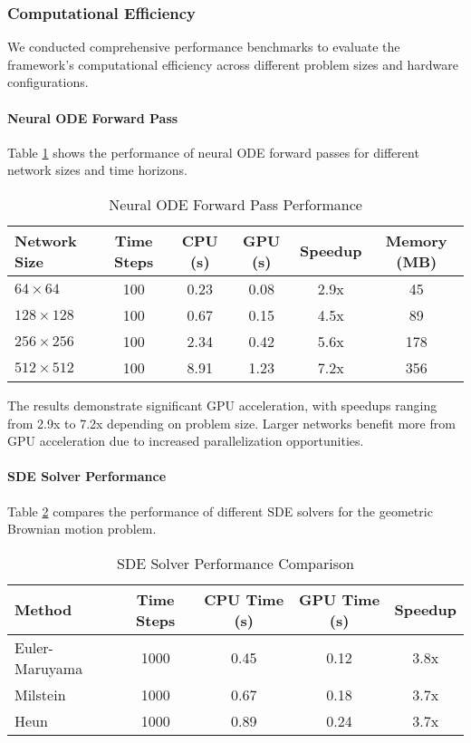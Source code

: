 \subsubsection{Computational Efficiency}

We conducted comprehensive performance benchmarks to evaluate the framework's computational efficiency across different problem sizes and hardware configurations.

\paragraph{Neural ODE Forward Pass}
Table \ref{tab:neural_ode_performance} shows the performance of neural ODE forward passes for different network sizes and time horizons.

\begin{table}[h]
\centering
\caption{Neural ODE Forward Pass Performance}
\label{tab:neural_ode_performance}
\begin{tabular}{lccccc}
\toprule
Network Size & Time Steps & CPU (s) & GPU (s) & Speedup & Memory (MB) \\
\midrule
$64 \times 64$ & 100 & 0.23 & 0.08 & 2.9x & 45 \\
$128 \times 128$ & 100 & 0.67 & 0.15 & 4.5x & 89 \\
$256 \times 256$ & 100 & 2.34 & 0.42 & 5.6x & 178 \\
$512 \times 512$ & 100 & 8.91 & 1.23 & 7.2x & 356 \\
\bottomrule
\end{tabular}
\end{table}

The results demonstrate significant GPU acceleration, with speedups ranging from 2.9x to 7.2x depending on problem size. Larger networks benefit more from GPU acceleration due to increased parallelization opportunities.

\paragraph{SDE Solver Performance}
Table \ref{tab:sde_solver_performance} compares the performance of different SDE solvers for the geometric Brownian motion problem.

\begin{table}[h]
\centering
\caption{SDE Solver Performance Comparison}
\label{tab:sde_solver_performance}
\begin{tabular}{lcccc}
\toprule
Method & Time Steps & CPU Time (s) & GPU Time (s) & Speedup \\
\midrule
Euler-Maruyama & 1000 & 0.45 & 0.12 & 3.8x \\
Milstein & 1000 & 0.67 & 0.18 & 3.7x \\
Heun & 1000 & 0.89 & 0.24 & 3.7x \\
\bottomrule
\end{tabular}
\end{table}

